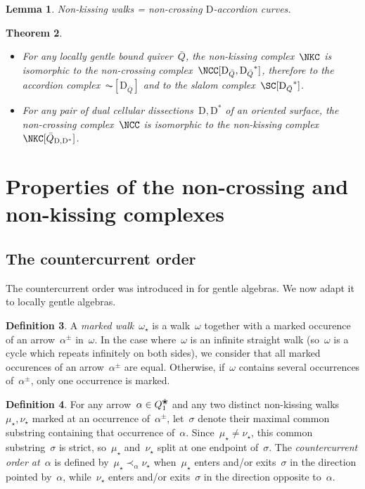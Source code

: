 \documentclass{amsart}
\newtheorem{theorem}{Theorem}[]
\newtheorem{lemma}[theorem]{Lemma}
\theoremstyle{definition}
\newtheorem{definition}[theorem]{Definition}
\newcommand{\darkblue}{\color{darkblue}} %
\newcommand{\defn}[1]{\textsl{\darkblue #1}} %
\newcommand{\pierreguy}[1]{\todo[color=green!30]{#1 \\ \hfill --- PG.}}
\newcommand{\blossom}{^\text{\ding{96}}} %
\newcommand{\dual}{^*} %
\newcommand{\dissection}{\mathrm{D}} %
\begin{document}
\begin{lemma}
\label{lem:nonKissing=nonCrossing}
Non-kissing walks = non-crossing $\dissection$-accordion curves.
\end{lemma}

\begin{theorem}
\label{thm:complexesCoincide}
\begin{itemize}
\item For any locally gentle bound quiver~$\bar Q$, the non-kissing complex~$\NKC$ is isomorphic to the non-crossing complex~$\NCC[\dissection_{\bar Q}, {\dissection_{\bar Q}}\dual]$, therefore to the accordion complex~$\AC[\dissection_{\bar Q}]$ and to the slalom complex~$\SC[{\dissection_{\bar Q}}\dual]$.
\item For any pair of dual cellular dissections~$\dissection, \dissection\dual$ of an oriented surface, the non-crossing complex~$\NCC$ is isomorphic to the non-kissing complex~$\NKC[\bar Q_{\dissection, \dissection\dual}]$.
\end{itemize}
\end{theorem}


\section{Properties of the non-crossing and non-kissing complexes}

\subsection{The countercurrent order}
The countercurrent order was introduced in \cite{PaluPilaudPlamondon} for gentle algebras.  We now adapt it to locally gentle algebras.

\begin{definition}
A \defn{marked walk}~$\omega_\star$ is a walk~$\omega$ together with a marked occurence of an arrow~$\alpha^{\pm}$ in~$\omega$.
In the case where~$\omega$ is an infinite straight walk (so~$\omega$ is a cycle which repeats infinitely on both sides), we consider that all marked occurences of an arrow~$\alpha^\pm$ are equal.
Otherwise, if~$\omega$ contains several occurrences of~$\alpha^\pm$, only one occurrence is marked.
\end{definition}

\begin{definition}
For any arrow~$\alpha \in Q\blossom_1$ and any two distinct non-kissing walks~$\mu_\star, \nu_\star$ marked at an occurrence of~$\alpha^\pm$,
let~$\sigma$ denote their maximal common substring containing that occurrence of~$\alpha$.
Since~$\mu_\star \ne \nu_\star$, this common substring~$\sigma$ is strict, so~$\mu_\star$ and~$\nu_\star$ split at one endpoint of~$\sigma$.
The \defn{countercurrent order at~$\alpha$} is defined by~$\mu_\star \prec_\alpha \nu_\star$ when~$\mu_\star$ enters and/or exits~$\sigma$ in the direction pointed by~$\alpha$, while~$\nu_\star$ enters and/or exits~$\sigma$ in the direction opposite to~$\alpha$.
\end{definition}
\pierreguy{Add a picture here?}
\end{document}
